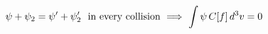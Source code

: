 \documentclass[preview]{standalone}
\begin{document}
\begin{align*}
\special{dvisvgm:raw <g id='unique000'>}\psi+\psi_2=\psi'+\psi_2'\ \ \text{in every collision}\ \Longrightarrow\ \int\psi\,C[f]\,d^3v=0\special{dvisvgm:raw </g>}
\end{align*}
\end{document}
